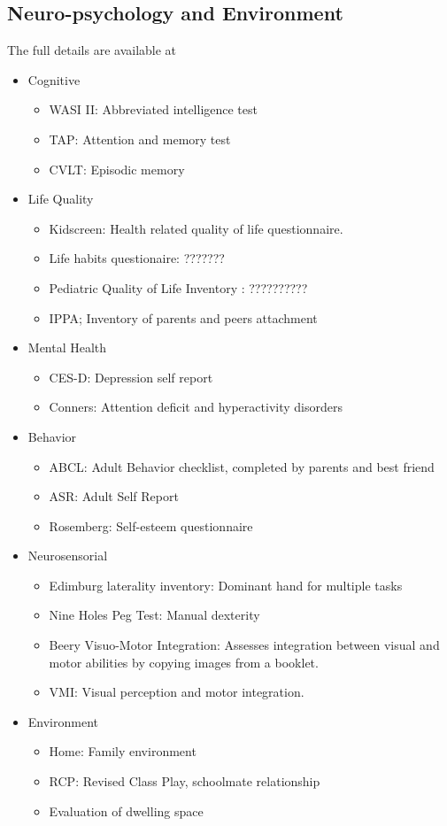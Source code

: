 \subsection{Neuro-psychology and Environment}

The full details are available at \autocite{FINAL REPORT}

\begin{itemize}
	\item Cognitive
	\begin{itemize}
		\item WASI II: Abbreviated intelligence test
		\item TAP: Attention and memory test
		\item CVLT: Episodic memory
	\end{itemize}
	\item Life Quality
	\begin{itemize}
		\item Kidscreen: Health related quality of life questionnaire.
		\item Life habits questionaire: ???????
		\item Pediatric Quality of Life Inventory : ??????????
		\item IPPA; Inventory of parents and peers attachment
	\end{itemize}
	\item Mental Health
	\begin{itemize}
		\item CES-D: Depression self report
		\item Conners: Attention deficit and hyperactivity disorders
	\end{itemize}
	\item Behavior
	\begin{itemize}
		\item ABCL: Adult Behavior checklist, completed by parents and best friend
		\item ASR: Adult Self Report
		\item Rosemberg: Self-esteem questionnaire
	\end{itemize}
	\item Neurosensorial 
	\begin{itemize}
		\item Edimburg laterality inventory: Dominant hand for multiple tasks
		\item Nine Holes Peg Test: Manual dexterity
		\item Beery Visuo-Motor Integration: Assesses integration between visual and motor abilities by copying images from a booklet.
		\item VMI: Visual perception and motor integration.
	\end{itemize}
	\item Environment
	\begin{itemize}
		\item Home: Family environment
		\item RCP: Revised Class Play, schoolmate relationship
		\item Evaluation of dwelling space
	\end{itemize}
\end{itemize}


